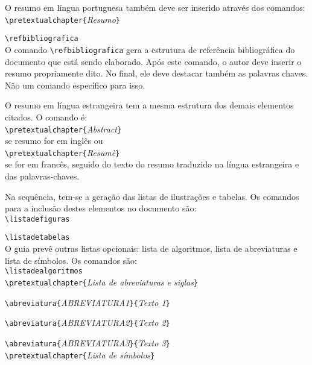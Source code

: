 \documentclass[a4paper,12pt,oneside,onecolumn]{article}
\newcommand{\comando}[1]{\texttt{\textbackslash #1}}
\newcommand{\param}[1]{\texttt{\{}\textsl{#1}\texttt{\}}}
\begin{document}
O resumo em língua portuguesa também deve ser inserido através dos comandos:\\

\comando{pretextualchapter}\param{Resumo}

\comando{refbibliografica}\\

\noindent O comando \comando{refbibliografica} gera a estrutura de referência bibliográfica do documento que está sendo elaborado. Após este comando, o autor deve inserir o resumo propriamente dito. No final, ele deve destacar também as palavras chaves. Não um comando específico para isso.

O resumo em língua estrangeira tem a mesma estrutura dos demais elementos citados. O comando é:\\

\comando{pretextualchapter}\param{Abstract}\\

\noindent se resumo for em inglês ou\\

\comando{pretextualchapter}\param{Resum\`e}\\

\noindent se for em francês, seguido do texto do resumo traduzido na língua estrangeira e das palavras-chaves.

Na sequência, tem-se a geração das listas de ilustrações e tabelas. Os comandos para a inclusão destes elementos no documento são:\\

\comando{listadefiguras}

\comando{listadetabelas}\\

O guia prevê outras listas opcionais: lista de algoritmos, lista de abreviaturas e lista de símbolos. Os comandos são:\\

\comando{listadealgoritmos}\\

\comando{pretextualchapter}\param{Lista de abreviaturas e siglas}

\comando{abreviatura}\param{ABREVIATURA1}\param{Texto 1}

\comando{abreviatura}\param{ABREVIATURA2}\param{Texto 2}

\comando{abreviatura}\param{ABREVIATURA3}\param{Texto 3}\\

\comando{pretextualchapter}\param{Lista de símbolos}
\end{document}

